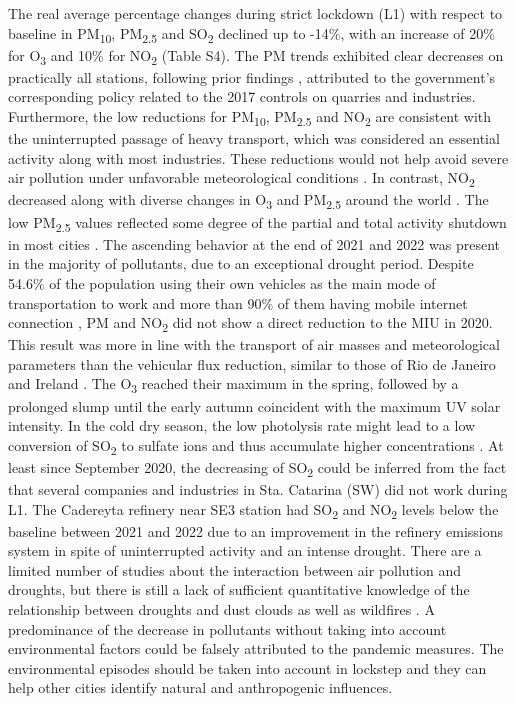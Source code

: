 \documentclass[preprint,12pt]{elsarticle}
\begin{document}
The real average percentage changes during strict lockdown (L1) with respect to baseline in PM\textsubscript{10}, PM\textsubscript{2.5} and SO\textsubscript{2} declined up to -14\%, with an increase of 20\% for O\textsubscript{3} and 10\% for NO\textsubscript{2} (Table S4). The PM trends exhibited clear decreases on practically all stations, following prior findings \citep{Aguirre_L_pez_2022}, attributed to the government's corresponding policy related to the 2017 controls on quarries and industries. Furthermore, the low reductions for PM\textsubscript{10}, PM\textsubscript{2.5} and NO\textsubscript{2} are consistent with the uninterrupted passage of heavy transport, which was considered an essential activity along with most industries. These reductions would not help avoid severe air pollution under unfavorable meteorological conditions \citep{Wang_2020}. In contrast, NO\textsubscript{2} decreased along with diverse changes in O\textsubscript{3} and PM\textsubscript{2.5} around the world \citep{Sokhi2021}. The low PM\textsubscript{2.5} values reflected some degree of the partial and total activity shutdown in most cities \citep{Chauhan_2020,Saha_2022}. The ascending behavior at the end of 2021 and 2022 was present in the majority of pollutants, due to an exceptional drought period. Despite 54.6\% of the population using their own vehicles as the main mode of transportation to work \citep{mxico} and more than 90\% of them having mobile internet connection \citep{inegi2021b}, PM and NO\textsubscript{2} did not show a direct reduction to the MIU in 2020. This result was more in line with the transport of air masses and meteorological parameters than the vehicular flux reduction, similar to those of Rio de Janeiro \citep{Dantas_2020} and Ireland \citep{Spohn_2021}. The O\textsubscript{3} reached their maximum in the spring, followed by a prolonged slump until the early autumn coincident with the maximum UV solar intensity. In the cold dry season, the low photolysis rate might lead to a low conversion of SO\textsubscript{2} to sulfate ions and thus accumulate higher concentrations \citep{Gonz_lez_2018}. At least since September 2020, the decreasing of SO\textsubscript{2} could be inferred from the fact that several companies and industries in Sta. Catarina (SW) did not work during L1. The Cadereyta refinery near SE3 station had SO\textsubscript{2} and NO\textsubscript{2} levels below the baseline between 2021 and 2022 due to an improvement in the refinery emissions system in spite of uninterrupted activity and an intense drought. There are a limited number of studies about the interaction between air pollution and droughts, but there is still a lack of sufficient quantitative knowledge of the relationship between droughts and dust clouds as well as wildfires \citep{He_2024}. A predominance of the decrease in pollutants without taking into account environmental factors could be falsely attributed to the pandemic measures. The environmental episodes should be taken into account in lockstep \citep{Liu2020} and they can help other cities identify natural and anthropogenic influences.
\end{document}
